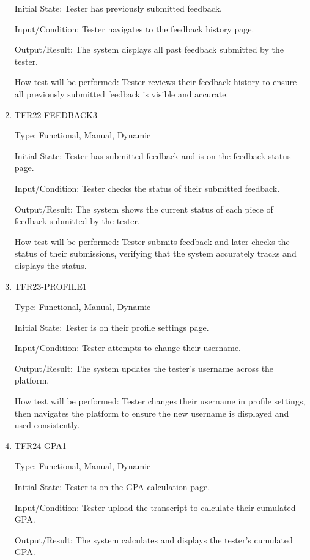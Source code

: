 \documentclass[12pt, titlepage]{article}
\begin{document}
\begin{enumerate}
Initial State: Tester has previously submitted feedback.

Input/Condition: Tester navigates to the feedback history page.

Output/Result: The system displays all past feedback submitted by the tester.

How test will be performed: Tester reviews their feedback history to ensure all previously submitted feedback is visible and accurate.

\item{TFR22-FEEDBACK3\\}\label{TFR22-FEEDBACK3}

Type: Functional, Manual, Dynamic

Initial State: Tester has submitted feedback and is on the feedback status page.

Input/Condition: Tester checks the status of their submitted feedback.

Output/Result: The system shows the current status of each piece of feedback submitted by the tester.

How test will be performed: Tester submits feedback and later checks the status of their submissions, verifying that the system accurately tracks and displays the status.

\item{TFR23-PROFILE1\\}\label{TFR23-PROFILE1}

Type: Functional, Manual, Dynamic

Initial State: Tester is on their profile settings page.

Input/Condition: Tester attempts to change their username.

Output/Result: The system updates the tester's username across the platform.

How test will be performed: Tester changes their username in profile settings, then navigates the platform to ensure the new username is displayed and used consistently.

\item{TFR24-GPA1\\}\label{TFR24-GPA1}

Type: Functional, Manual, Dynamic

Initial State: Tester is on the GPA calculation page.

Input/Condition: Tester upload the transcript to calculate their cumulated GPA.

Output/Result: The system calculates and displays the tester's cumulated GPA.


\end{enumerate}
\end{document}

